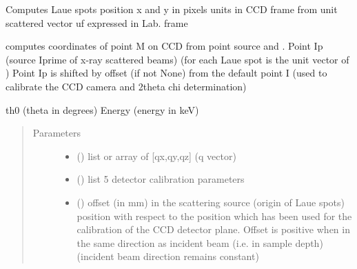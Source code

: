 \documentclass[letterpaper,10pt,english]{sphinxmanual}
\begin{document}
\begin{fulllineitems}
\label{\detokenize{Simulation_Module:LaueTools.LaueGeometry.calc_xycam}}
Computes Laue spots position x and y in pixels units in CCD frame
from unit scattered vector uf expressed in Lab. frame

computes coordinates of point M on CCD from point source and .
Point Ip (source Iprime of x-ray scattered beams)
(for each Laue spot  is the unit vector of )
Point Ip is shifted by offset (if not None) from the default point I
(used to calibrate the CCD camera and 2theta chi determination)

th0 (theta in degrees)
Energy (energy in keV)
\begin{quote}\begin{description}
\item[{Parameters}] \leavevmode\begin{itemize}
\item {} 
 (\sphinxstyleliteralemphasis{\sphinxupquote{ (}}\sphinxstyleliteralemphasis{\sphinxupquote{)}}) \textendash{} list or array of {[}qx,qy,qz{]} (q vector)

\item {} 
 () \textendash{} list 5 detector calibration parameters

\item {} 
 (\sphinxstyleliteralemphasis{\sphinxupquote{ (}}\sphinxstyleliteralemphasis{\sphinxupquote{{[}}}\sphinxstyleliteralemphasis{\sphinxupquote{,}}\sphinxstyleliteralemphasis{\sphinxupquote{,}}\sphinxstyleliteralemphasis{\sphinxupquote{{]}}}\sphinxstyleliteralemphasis{\sphinxupquote{)}}) \textendash{} offset (in mm) in the scattering source (origin of Laue spots)
position with respect to the position which has been used
for the calibration of  the CCD detector plane. Offset is positive when in the same
direction as incident beam (i.e. in sample depth)
(incident beam direction remains constant)


\end{itemize}
\end{description}
\end{quote}
\end{fulllineitems}
\end{document}
